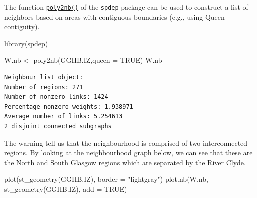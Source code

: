 \documentclass[
  letterpaper,
  DIV=11,
  numbers=noendperiod]{scrartcl}
\newenvironment{Shaded}{\begin{snugshade}}{\end{snugshade}}
\newcommand{\AttributeTok}[1]{\textcolor[rgb]{0.40,0.45,0.13}{#1}}
\newcommand{\ConstantTok}[1]{\textcolor[rgb]{0.56,0.35,0.01}{#1}}
\newcommand{\FunctionTok}[1]{\textcolor[rgb]{0.28,0.35,0.67}{#1}}
\newcommand{\NormalTok}[1]{\textcolor[rgb]{0.00,0.23,0.31}{#1}}
\newcommand{\OtherTok}[1]{\textcolor[rgb]{0.00,0.23,0.31}{#1}}
\newcommand{\StringTok}[1]{\textcolor[rgb]{0.13,0.47,0.30}{#1}}
\begin{document}
The function
\href{https://r-spatial.github.io/spdep/reference/poly2nb.html}{\texttt{poly2nb()}}
of the \texttt{spdep} package can be used to construct a list of
neighbors based on areas with contiguous boundaries (e.g., using Queen
contiguity).

\begin{Shaded}
\begin{Highlighting}[]
\FunctionTok{library}\NormalTok{(spdep)}

\NormalTok{W.nb }\OtherTok{\textless{}{-}} \FunctionTok{poly2nb}\NormalTok{(GGHB.IZ,}\AttributeTok{queen =} \ConstantTok{TRUE}\NormalTok{)}
\NormalTok{W.nb}
\end{Highlighting}
\end{Shaded}

\begin{verbatim}
Neighbour list object:
Number of regions: 271 
Number of nonzero links: 1424 
Percentage nonzero weights: 1.938971 
Average number of links: 5.254613 
2 disjoint connected subgraphs
\end{verbatim}

The warning tell us that the neighbourhood is comprised of two
interconnected regions. By looking at the neighbourhood graph below, we
can see that these are the North and South Glasgow regions which are
separated by the River Clyde.

\begin{Shaded}
\begin{Highlighting}[]
\FunctionTok{plot}\NormalTok{(}\FunctionTok{st\_geometry}\NormalTok{(GGHB.IZ), }\AttributeTok{border =} \StringTok{"lightgray"}\NormalTok{)}
\FunctionTok{plot.nb}\NormalTok{(W.nb, }\FunctionTok{st\_geometry}\NormalTok{(GGHB.IZ), }\AttributeTok{add =} \ConstantTok{TRUE}\NormalTok{)}
\end{Highlighting}
\end{Shaded}
\end{document}
